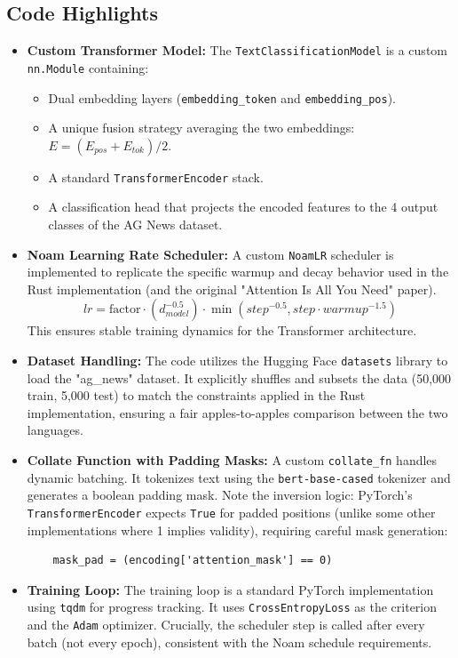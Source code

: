 \documentclass[11pt,a4paper]{article}
\begin{document}
\subsection{Code Highlights}
\begin{itemize}
    \item \textbf{Custom Transformer Model:}
    The \texttt{TextClassificationModel} is a custom \texttt{nn.Module} containing:
    \begin{itemize}
        \item Dual embedding layers (\texttt{embedding\_token} and \texttt{embedding\_pos}).
        \item A unique fusion strategy averaging the two embeddings: $E = (E_{pos} + E_{tok}) / 2$.
        \item A standard \texttt{TransformerEncoder} stack.
        \item A classification head that projects the encoded features to the 4 output classes of the AG News dataset.
    \end{itemize}
    \item \textbf{Noam Learning Rate Scheduler:}
    A custom \texttt{NoamLR} scheduler is implemented to replicate the specific warmup and decay behavior used in the Rust implementation (and the original "Attention Is All You Need" paper).
    \[
    lr = \text{factor} \cdot (d_{model}^{-0.5}) \cdot \min(step^{-0.5}, step \cdot warmup^{-1.5})
    \]
    This ensures stable training dynamics for the Transformer architecture.
    \item \textbf{Dataset Handling:}
    The code utilizes the Hugging Face \texttt{datasets} library to load the "ag\_news" dataset. It explicitly shuffles and subsets the data (50,000 train, 5,000 test) to match the constraints applied in the Rust implementation, ensuring a fair apples-to-apples comparison between the two languages.
    \item \textbf{Collate Function with Padding Masks:}
    A custom \texttt{collate\_fn} handles dynamic batching. It tokenizes text using the \texttt{bert-base-cased} tokenizer and generates a boolean padding mask. Note the inversion logic: PyTorch's \texttt{TransformerEncoder} expects \texttt{True} for padded positions (unlike some other implementations where 1 implies validity), requiring careful mask generation:
    \begin{verbatim}
    mask_pad = (encoding['attention_mask'] == 0)
    \end{verbatim}
    \item \textbf{Training Loop:}
    The training loop is a standard PyTorch implementation using \texttt{tqdm} for progress tracking. It uses \texttt{CrossEntropyLoss} as the criterion and the \texttt{Adam} optimizer. Crucially, the scheduler step is called after every batch (not every epoch), consistent with the Noam schedule requirements.
\end{itemize}
\end{document}
